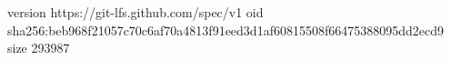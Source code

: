 version https://git-lfs.github.com/spec/v1
oid sha256:beb968f21057c70c6af70a4813f91eed3d1af60815508f66475388095dd2ecd9
size 293987
